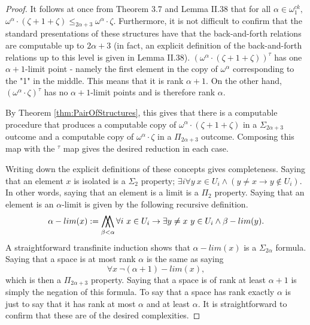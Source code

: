 \documentclass[11pt]{amsart}
\newcommand{\bigwwedge}{%
  \mathop{
    \mathchoice{\bigwedge\mkern-15mu\bigwedge}
               {\bigwedge\mkern-12.5mu\bigwedge}
               {\bigwedge\mkern-12.5mu\bigwedge}
               {\bigwedge\mkern-11mu\bigwedge}
    }
}
\theoremstyle{remark}
\begin{document}
\begin{proof}
It follows at once from \cite{GR24} Theorem 3.7 and \cite{MBook} Lemma II.38 that for all $\alpha\in\omega_1^{ck},$ $\omega^\alpha\cdot(\zeta+1+\zeta) \leq_{2\alpha+3} \omega^\alpha\cdot\zeta$.
Furthermore, it is not difficult to confirm that the standard presentations of these structures have that the back-and-forth relations are computable up to $2\alpha+3$ (in fact, an explicit definition of the back-and-forth relations up to this level is given in \cite{MBook} Lemma II.38).
$(\omega^\alpha\cdot(\zeta+1+\zeta))^\tau$ has one $\alpha+1$-limit point - namely the first element in the copy of $\omega^\alpha$ corresponding to the "1" in the middle.
This means that it is rank $\alpha+1$.
On the other hand, $(\omega^\alpha\cdot\zeta)^\tau$ has no $\alpha+1$-limit points and is therefore rank $\alpha$.

By Theorem \ref{thm:PairOfStructures}, this gives that there is a computable procedure that produces a computable copy of $\omega^\alpha\cdot(\zeta+1+\zeta)$ in a $\Sigma_{2\alpha+3}$ outcome and a computable copy of $\omega^\alpha\cdot\zeta$ in a $\Pi_{2\alpha+3}$ outcome.
Composing this map with the $^\tau$ map gives the desired reduction in each case.


Writing down the explicit definitions of these concepts gives completeness. 
Saying that an element $x$ is isolated is a $\Sigma_2$ property; $\exists i \forall y ~ x\in U_i \land (y\neq x\to y\not\in U_i).$
In other words, saying that an element is a limit is a $\Pi_2$ property.
Saying that an element is an $\alpha$-limit is given by the following recursive definition.
\[ \alpha-lim(x):=\bigwwedge_{\beta<\alpha} \forall i ~ x\in U_i \to \exists y\neq x ~ y\in U_i \land \beta-lim(y).\]
A straightforward transfinite induction shows that $\alpha-lim(x)$ is a $\Sigma_{2\alpha}$ formula.
Saying that a space is at most rank $\alpha$ is the same as saying
\[\forall x ~ \lnot (\alpha+1)-lim(x),\]
which is then a $\Pi_{2\alpha+3}$ property.
Saying that a space is of rank at least $\alpha+1$ is simply the negation of this formula.
To say that a space has rank exactly $\alpha$ is just to say that it has rank at most $\alpha$ and at least $\alpha$.
It is straightforward to confirm that these are of the desired complexities.

\end{proof}

















\end{document}
